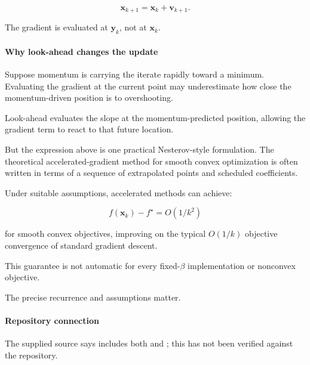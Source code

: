 \[
\mathbf x_{k+1}=\mathbf x_k+\mathbf v_{k+1}.
\]

The gradient is evaluated at \(\mathbf y_k\), not at \(\mathbf x_k\).

\paragraph{Why look-ahead changes the update}\label{02-foundations-ii-ch026-why-look-ahead-changes-the-update}

\hypertarget{02-foundations-ii-ch026-why-look-ahead-changes-the-update}{}

Suppose momentum is carrying the iterate rapidly toward a minimum. Evaluating the gradient at the current point may underestimate how close the momentum-driven position is to overshooting.

Look-ahead evaluates the slope at the momentum-predicted position, allowing the gradient term to react to that future location.

But the expression above is one practical Nesterov-style formulation. The theoretical accelerated-gradient method for smooth convex optimization is often written in terms of a sequence of extrapolated points and scheduled coefficients.

Under suitable assumptions, accelerated methods can achieve:

\[
f(\mathbf x_k)-f^\star=O(1/k^2)
\]

for smooth convex objectives, improving on the typical \(O(1/k)\) objective convergence of standard gradient descent.

This guarantee is not automatic for every fixed-\(\beta\) implementation or nonconvex objective.

The precise recurrence and assumptions matter.

\paragraph{Repository connection}\label{02-foundations-ii-ch026-repository-connection}

\hypertarget{02-foundations-ii-ch026-repository-connection}{}

The supplied source says  includes both  and ; this has not been verified against the repository.


